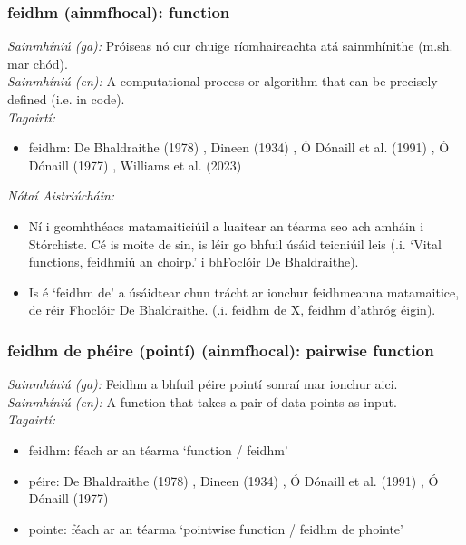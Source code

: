 \subsubsection*{feidhm (ainmfhocal): function}
 \noindent \textit{Sainmhíniú (ga):} Próiseas nó cur chuige ríomhaireachta atá sainmhínithe (m.sh. mar chód).
\\
 \noindent \textit{Sainmhíniú (en):} A computational process or algorithm that can be precisely defined (i.e. in code).
\\
 \noindent \textit{Tagairtí:}
\begin{itemize}
	\item feidhm: De Bhaldraithe (1978) \cite{de-bhaldraithe}, Dineen (1934) \cite{dineen}, Ó Dónaill et al. (1991) \cite{focloir-beag}, Ó Dónaill (1977) \cite{odonaill}, Williams et al. (2023) \cite{storchiste}
\end{itemize}

 \noindent \textit{Nótaí Aistriúcháin:}
\begin{itemize}
	\item Ní i gcomhthéacs matamaiticiúil a luaitear an téarma seo ach amháin i Stórchiste. Cé is moite de sin, is léir go bhfuil úsáid teicniúil leis (.i. `Vital functions, feidhmiú an choirp.' i bhFoclóir De Bhaldraithe).
	\item Is é `feidhm de' a úsáidtear chun trácht ar ionchur feidhmeanna matamaitice, de réir Fhoclóir De Bhaldraithe. (.i. feidhm de X, feidhm d'athróg éigin).
\end{itemize}


\subsubsection*{feidhm de phéire (pointí) (ainmfhocal): pairwise function}
 \noindent \textit{Sainmhíniú (ga):} Feidhm a bhfuil péire pointí sonraí mar ionchur aici.
\\
 \noindent \textit{Sainmhíniú (en):} A function that takes a pair of data points as input.
\\
 \noindent \textit{Tagairtí:}
\begin{itemize}
	\item feidhm: féach ar an téarma `function / feidhm'
	\item péire: De Bhaldraithe (1978) \cite{de-bhaldraithe}, Dineen (1934) \cite{dineen}, Ó Dónaill et al. (1991) \cite{focloir-beag}, Ó Dónaill (1977) \cite{odonaill}
	\item pointe: féach ar an téarma `pointwise function / feidhm de phointe'
\end{itemize}

